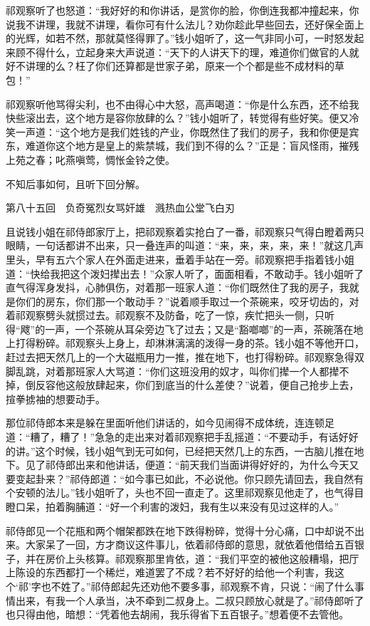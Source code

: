 \documentclass[12pt,UTF8]{ctexbook}
\begin{document}
{{{祁观察听了也怒道：“我好好的和你讲话，是赏你的脸，你倒连我都冲撞起来，你说我不讲理，我就不讲理，看你可有什么法儿？劝你趁此早些回去，还好保全面上的光辉，如若不然，那就莫怪得罪了。”钱小姐听了，这一气非同小可，一时怒发起来顾不得什么，立起身来大声说道：“天下的人讲天下的理，难道你们做官的人就好不讲理的么？枉了你们还算都是世家子弟，原来一个个都是些不成材料的草包！”

祁观察听他骂得尖利，也不由得心中大怒，高声喝道：“你是什么东西，还不给我快些滚出去，这个地方是容你放肆的么？”钱小姐听了，转觉得有些好笑。便又冷笑一声道：“这个地方是我们姓钱的产业，你既然住了我们的房子，我和你便是宾东，难道你这个地方是皇上的紫禁城，我们到不得的么？”正是：盲风怪雨，摧残上苑之春；叱燕嗔莺，惆怅金铃之使。

不知后事如何，且听下回分解。





第八十五回　负奇冤烈女骂奸雄　溅热血公堂飞白刃





且说钱小姐在祁侍郎家厅上，把祁观察着实抢白了一番，祁观察只气得白瞪着两只眼睛，一句话都讲不出来，只一叠连声的叫道：“来，来，来，来，来！”就这几声里头，早有五六个家人在外面走进来，垂着手站在一旁。祁观察把手指着钱小姐道：“快给我把这个泼妇撵出去！”众家人听了，面面相看，不敢动手。钱小姐听了直气得浑身发抖，心肺俱伤，对着那一班家人道：“你们既然住了我的房子，我就是你们的房东，你们那一个敢动手？”说着顺手取过一个茶碗来，咬牙切齿的，对着祁观察劈头就掼过去。祁观察不及防备，吃了一惊，疾忙把头一侧，只听得“飕”的一声，一个茶碗从耳朵旁边飞了过去；又是“豁啷啷”的一声，茶碗落在地上打得粉碎。祁观察头上身上，却淋淋漓漓的泼得一身的茶。钱小姐不等他开口，赶过去把天然几上的一个大磁瓶用力一推，推在地下，也打得粉碎。祁观察急得双脚乱跳，对着那班家人大骂道：“你们这班没用的奴才，叫你们撵一个人都撵不掉，倒反容他这般放肆起来，你们到底当的什么差使？”说着，便自己抢步上去，揎拳掳袖的想要动手。

那位祁侍郎本来是躲在里面听他们讲话的，如今见闹得不成体统，连连顿足道：“糟了，糟了！”急急的走出来对着祁观察把手乱摇道：“不要动手，有话好好的讲。”这个时候，钱小姐气到无可如何，已经把天然几上的东西，一古脑儿推在地下。见了祁侍郎出来和他讲话，便道：“前天我们当面讲得好好的，为什么今天又要变起卦来？”祁侍郎道：“如今事已如此，不必说他。你只顾先请回去，我自然有个安顿的法儿。”钱小姐听了，头也不回一直走了。这里祁观察见他走了，也气得目瞪口呆，拍着胸脯道：“好一个利害的泼妇，我有生以来没有见过这样的人。”

祁侍郎见一个花瓶和两个帽架都跌在地下跌得粉碎，觉得十分心痛，口中却说不出来。大家呆了一回，方才商议这件事儿，依着祁侍郎的意思，就依着他借给五百银子，并在房价上头核算。祁观察那里肯依，道：“我们平空的被他这般糟塌，把厅上陈设的东西都打一个稀烂，难道罢了不成？若不好好的给他一个利害，我这个‘祁’字也不姓了。”祁侍郎起先还劝他不要多事，祁观察不肯，只说：“闹了什么事情出来，有我一个人承当，决不牵到二叔身上。二叔只顾放心就是了。”祁侍郎听了也只得由他，暗想：“凭着他去胡闹，我乐得省下五百银子。”想着便不去管他。

}}}
\end{document}
